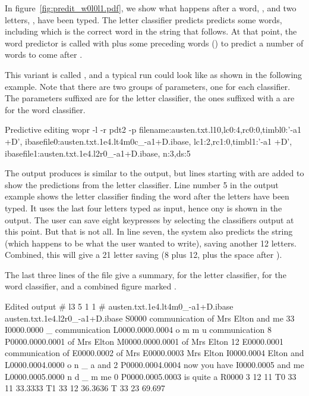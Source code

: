 \documentclass[a4paper,10pt,twoside]{report}
\begin{document}
In figure~\ref{fig:predit_w0l0l1.pdf}, we show what happens after a word,
, and two letters, , have been typed. The letter classifier
predicts predicts some words, including  which is the correct word in
the string that follows. At that point, the word predictor is called with
 plus some preceding words () to predict a number of words to
come after .

This variant is called , and a typical run could look like as shown in
the following example. Note that there are two groups of parameters, one for
each classifier. The parameters suffixed  are for the letter classifier,
the ones suffixed with a  are for the word classifier.

\begin{bash}{Predictive editing}
wopr -l -r pdt2 -p filename:austen.txt.l10,lc0:4,rc0:0,timbl0:'-a1 +D',
                   ibasefile0:austen.txt.1e4.lt4m0c_-a1+D.ibase,
                   lc1:2,rc1:0,timbl1:'-a1 +D',
                   ibasefile1:austen.txt.1e4.l2r0_-a1+D.ibase,
                   n:3,ds:5
\end{bash}

The output produces is similar to the  output, but lines starting with
 are added to show the predictions from the letter classifier. Line
number 5 in the output example shows the letter classifier finding the word
 after the letters  have been typed. It uses the
last four letters typed as input, hence ony  is shown in the
output. The user can save eight keypresses by selecting the classifiers output
at this point. But that is not all. In line seven, the system also predicts the
string  (which happens to be what the user wanted to write),
saving another 12 letters. Combined, this will give a 21 letter saving (8 plus
12, plus the space after ).

The last three lines of the file give a summary,  for the letter
classifier,  for the word classifier, and a combined figure marked
. 

\begin{wout}{Edited output}
# l3 5 1 1
# austen.txt.1e4.lt4m0_-a1+D.ibase austen.txt.1e4.l2r0_-a1+D.ibase
S0000 communication of Mrs Elton and me 33
I0000.0000 _ communication
L0000.0000.0004 o m m u communication 8
P0000.0000.0001 of Mrs Elton
M0000.0000.0001 of Mrs Elton 12
E0000.0001 communication of
E0000.0002 of Mrs
E0000.0003 Mrs Elton
I0000.0004 Elton and
L0000.0004.0000 o n _ a and 2
P0000.0004.0004 now you have
I0000.0005 and me
L0000.0005.0000 n d _ m me 0
P0000.0005.0003 is quite a
R0000 3 12 11
T0 33 11 33.3333
T1 33 12 36.3636
T 33 23 69.697
\end{wout}
\end{document}
